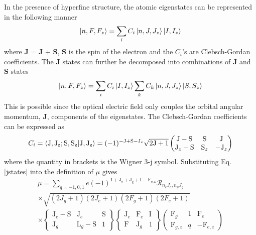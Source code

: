 In the presence of hyperfine structure, the atomic eigenstates can be represented in the following manner
\begin{equation}
\ket{n,F,F_z} = \sum_iC_i\ket{n,J,J_z}\ket{I,I_z}
\label{jstates}
\end{equation}
where \textbf{J}  =\textbf{ J} + \textbf{S}, \textbf{S} is the spin of the electron and the $C_i$'s are Clebsch-Gordan coefficients. The \textbf{J} states can further be decomposed into combinations of \textbf{J} and \textbf{S} states
\begin{equation}
\ket{n,F,F_z} = \sum_iC_i\ket{I,I_z}\sum_kC_k\ket{n,J,J_z}\ket{S,S_z}
\label{jstates}
\end{equation}
This is possible since the optical electric field only couples the orbital angular momentum, \textbf{J}, components of the eigenstates.  The Clebsch-Gordan coefficients can be expressed as
\begin{equation}
C_i = \braket{\mathrm{J,J_z ; S,S_z}|\mathrm{J,J_z}}=(-1)^{\mathrm{-J+S-J_z}}\sqrt{\mathrm{2J+1}}
\left(
\begin{matrix}
\mathrm{J}-\mathrm{S} & \mathrm{S} & \mathrm{J}\\
\mathrm{J}_z-\mathrm{S} & \mathrm{S}_z & -\mathrm{J}_z
\end{matrix}
\right)
\end{equation}
where the quantity in brackets is the Wigner 3-j symbol.
Substituting Eq. \ref{jstates} into the definition of $\mu$ gives 
\begin{equation}
\begin{split}
\mu = \sum_{q = -1,0,1} e (-1)^{\mathrm{1+J_e+J_g+I-F_{e,z}}}\mathcal{R}_{n_e J_e, n_g J_g}\\
\times \sqrt{(2J_g+1)(2J_e+1)(2F_g+1)(2F_e+1)}\\
\times \left\lbrace
\begin{matrix}
\mathrm{J}_e-\mathrm{S} & \mathrm{J}_e & \mathrm{S}\\
\mathrm{J}_g & \mathrm{L}_g-\mathrm{S} & 1
\end{matrix}
\right\rbrace
\left\lbrace
\begin{matrix}
\mathrm{J}_e & \mathrm{F}_e & \mathrm{I}\\
\mathrm{F} & \mathrm{J}_g &1
\end{matrix}
\right\rbrace
\left(
\begin{matrix}
\mathrm{F}_g & 1 & \mathrm{F}_e\\
\mathrm{F}_{g,z} & q &-\mathrm{F}_{e,z}
\end{matrix}
\right)
\end{split}
\end{equation}
